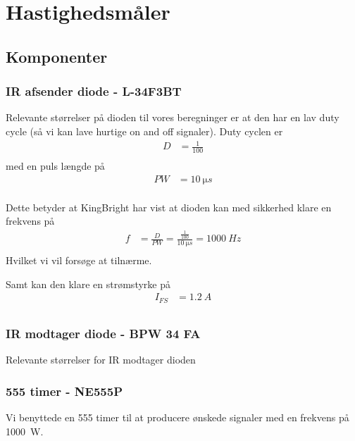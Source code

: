 \section{Hastighedsmåler}


\subsection{Komponenter}
\subsubsection{IR afsender diode - L-34F3BT}

Relevante størrelser på dioden \cite{kompIRafsender} til vores beregninger er at den har en lav duty cycle (så vi kan lave hurtige on and off signaler).
Duty cyclen er
\begin{align}
	D &= \frac{1}{100} \\
\end{align}
med en puls længde på 
\begin{align}
	PW &= \SI{10}{\micro s} \\
\end{align}

Dette betyder at KingBright har vist at dioden kan med sikkerhed klare en frekvens på
\begin{align}
	f &=  \frac{D}{PW} =  \frac{\frac{1}{100}}{\SI{10}{\micro s}} = \SI{1000}{Hz}\label{eq:oensketFrekvens}\\ 
\end{align}
Hvilket vi vil forsøge at tilnærme.

Samt kan den klare en strømstyrke på 
\begin{align}
	I_{FS} &= \SI{1.2}{A} \\
\end{align}

\subsubsection{IR modtager diode - BPW 34 FA}

Relevante størrelser for IR modtager dioden \cite{kompIRmodtager}

\subsubsection{555 timer - NE555P}
Vi benyttede en 555 timer til at producere ønskede signaler med en frekvens på \SI{1000}{W}. 

